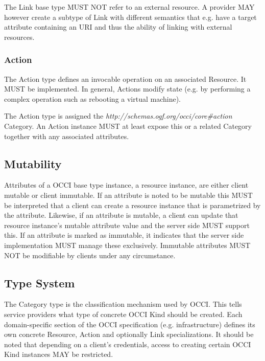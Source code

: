 \documentclass[10pt,a4paper]{article}
\begin{document}
The Link base type MUST NOT refer to an external resource. A provider MAY
however create a subtype of Link with different semantics that e.g. have a
target attribute containing an URI and thus the ability of linking with
external resources.

\subsubsection{Action}
The Action type defines an invocable operation on an associated Resource. It
MUST be implemented. In general, Actions modify state (e.g. by performing a
complex operation such as rebooting a virtual machine).

The Action type is assigned the
\textit{http://schemas.ogf.org/occi/core\#action} Category. An Action instance
MUST at least expose this or a related Category together with any associated
attributes.

\subsection{Mutability}
Attributes of a OCCI base type instance, a resource instance, are either client
mutable or client immutable. If an attribute is noted to be mutable this MUST
be interpreted that a client can create a resource instance that is
parametrized by the attribute. Likewise, if an attribute is mutable, a client
can update that resource instance's mutable attribute value and the server side
MUST support this. If an attribute is marked as immutable, it indicates that
the server side implementation MUST manage these exclusively. Immutable
attributes MUST NOT be modifiable by clients under any circumstance.

\subsection{Type System}
\label{sec:type_system}
The Category type is the classification mechanism used by OCCI. This tells
service providers what type of concrete OCCI Kind should be created. Each
domain-specific section of the OCCI specification (e.g. infrastructure) defines
its own concrete Resource, Action and optionally Link specializations. It
should be noted that depending on a client's credentials, access to creating
certain OCCI Kind instances MAY be restricted.
\end{document}
